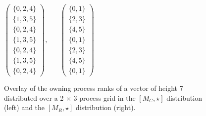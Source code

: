 \begin{figure}
\centering
$
\left(\begin{array}{c}
 \{0,2,4\} \\
 \{1,3,5\} \\
 \{0,2,4\} \\
 \{1,3,5\} \\
 \{0,2,4\} \\
 \{1,3,5\} \\
 \{0,2,4\} 
\end{array}\right),\;\;\;\;\;\;
\left(\begin{array}{c}
 \{0,1\} \\
 \{2,3\} \\
 \{4,5\} \\
 \{0,1\} \\
 \{2,3\} \\
 \{4,5\} \\
 \{0,1\} 
\end{array}\right)
$
\caption{Overlay of the owning process ranks of a vector of height 7 
distributed over a 2 $\times$ 3 process grid in the $[M_C,\star]$ 
distribution (left) and the $[M_R,\star]$ distribution (right).}
\label{fig:partial-matrix}
\end{figure}

